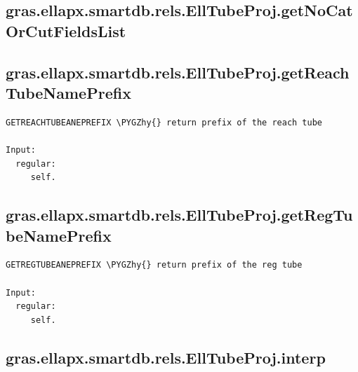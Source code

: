 \documentclass[letterpaper,10pt,english]{sphinxmanual}
\def\PYGZhy{\char`\-}
\begin{document}
\subsection{gras.ellapx.smartdb.rels.EllTubeProj.getNoCatOrCutFieldsList}
\label{chap_functions:gras-ellapx-smartdb-rels-elltubeproj-getnocatorcutfieldslist}

\subsection{gras.ellapx.smartdb.rels.EllTubeProj.getReachTubeNamePrefix}
\label{chap_functions:gras-ellapx-smartdb-rels-elltubeproj-getreachtubenameprefix}
\begin{Verbatim}[commandchars=\\\{\}]
GETREACHTUBEANEPREFIX \PYGZhy{} return prefix of the reach tube

Input:
  regular:
     self.
\end{Verbatim}


\subsection{gras.ellapx.smartdb.rels.EllTubeProj.getRegTubeNamePrefix}
\label{chap_functions:gras-ellapx-smartdb-rels-elltubeproj-getregtubenameprefix}
\begin{Verbatim}[commandchars=\\\{\}]
GETREGTUBEANEPREFIX \PYGZhy{} return prefix of the reg tube

Input:
  regular:
     self.
\end{Verbatim}


\subsection{gras.ellapx.smartdb.rels.EllTubeProj.interp}
\label{chap_functions:gras-ellapx-smartdb-rels-elltubeproj-interp}
\end{document}
